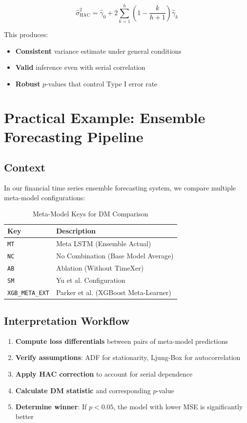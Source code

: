 \documentclass[11pt,a4paper]{article}
\begin{document}
\begin{equation}
\hat{\sigma}^2_{\text{HAC}} = \hat{\gamma}_0 + 2 \sum_{k=1}^{h} \left(1 - \frac{k}{h+1}\right) \hat{\gamma}_k
\end{equation}

This produces:
\begin{itemize}
    \item \textbf{Consistent} variance estimate under general conditions
    \item \textbf{Valid} inference even with serial correlation
    \item \textbf{Robust} $p$-values that control Type I error rate
\end{itemize}

\section{Practical Example: Ensemble Forecasting Pipeline}

\subsection{Context}

In our financial time series ensemble forecasting system, we compare multiple meta-model configurations:

\begin{table}[h]
\centering
\caption{Meta-Model Keys for DM Comparison}
\begin{tabular}{@{}ll@{}}
\toprule
\textbf{Key} & \textbf{Description} \\ \midrule
\texttt{MT} & Meta LSTM (Ensemble Actual) \\
\texttt{NC} & No Combination (Base Model Average) \\
\texttt{AB} & Ablation (Without TimeXer) \\
\texttt{SM} & Yu et al. Configuration \\
\texttt{XGB\_META\_EXT} & Parker et al. (XGBoost Meta-Learner) \\ \bottomrule
\end{tabular}
\end{table}

\subsection{Interpretation Workflow}

\begin{enumerate}
    \item \textbf{Compute loss differentials} between pairs of meta-model predictions
    \item \textbf{Verify assumptions}: ADF for stationarity, Ljung-Box for autocorrelation
    \item \textbf{Apply HAC correction} to account for serial dependence
    \item \textbf{Calculate DM statistic} and corresponding $p$-value
    \item \textbf{Determine winner}: If $p < 0.05$, the model with lower MSE is significantly better
\end{enumerate}
\end{document}

